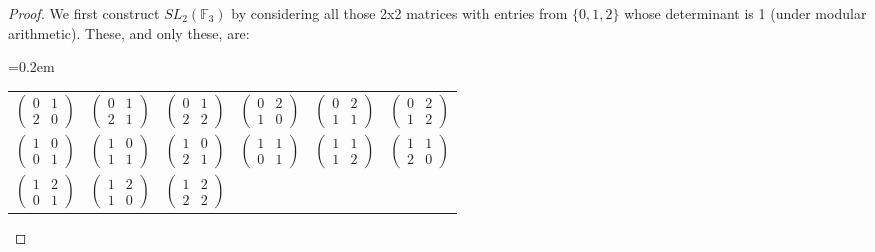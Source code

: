 \documentclass{article}
\begin{document}
\begin{proof}
    We first construct $SL_2(\mathbb{F}_3)$ by considering all those 2x2 matrices with entries from $\{ 0, 1, 2 \}$ whose determinant is 1 (under modular arithmetic). These, and only these, are:

    \begin{center}
        {\tabulinesep=0.2em
        \begin{tabu}{cccccc}
            $\begin{pmatrix}0 & 1 \\ 2 & 0\end{pmatrix}$ & $\begin{pmatrix}0 & 1 \\ 2 & 1\end{pmatrix}$ & $\begin{pmatrix}0 & 1 \\ 2 & 2\end{pmatrix}$ &
            $\begin{pmatrix}0 & 2 \\ 1 & 0\end{pmatrix}$ & $\begin{pmatrix}0 & 2 \\ 1 & 1\end{pmatrix}$ & $\begin{pmatrix}0 & 2 \\ 1 & 2\end{pmatrix}$ \\
            $\begin{pmatrix}1 & 0 \\ 0 & 1\end{pmatrix}$ & $\begin{pmatrix}1 & 0 \\ 1 & 1\end{pmatrix}$ & $\begin{pmatrix}1 & 0 \\ 2 & 1\end{pmatrix}$ &
            $\begin{pmatrix}1 & 1 \\ 0 & 1\end{pmatrix}$ & $\begin{pmatrix}1 & 1 \\ 1 & 2\end{pmatrix}$ & $\begin{pmatrix}1 & 1 \\ 2 & 0\end{pmatrix}$ \\
            $\begin{pmatrix}1 & 2 \\ 0 & 1\end{pmatrix}$ & $\begin{pmatrix}1 & 2 \\ 1 & 0\end{pmatrix}$ & $\begin{pmatrix}1 & 2 \\ 2 & 2\end{pmatrix}$ \\

\end{tabu}}
\end{center}
\end{proof}
\end{document}
